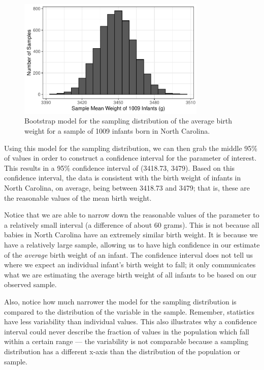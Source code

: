 \documentclass[
  letterpaper,
  DIV=11,
  numbers=noendperiod]{scrreprt}
\theoremstyle{definition}
\theoremstyle{definition}
\theoremstyle{plain}
\theoremstyle{remark}
\begin{document}
\begin{figure}

{\centering \includegraphics[width=0.8\textwidth,height=\textheight]{./images/fig-confint-samp-distn-1.pdf}

}

\caption{\label{fig-confint-samp-distn}Bootstrap model for the sampling
distribution of the average birth weight for a sample of 1009 infants
born in North Carolina.}

\end{figure}

Using this model for the sampling distribution, we can then grab the
middle 95\% of values in order to construct a confidence interval for
the parameter of interest. This results in a 95\% confidence interval of
(3418.73, 3479). Based on this confidence interval, the data is
consistent with the birth weight of infants in North Carolina, on
average, being between 3418.73 and 3479; that is, these are the
reasonable values of the mean birth weight.

Notice that we are able to narrow down the reasonable values of the
parameter to a relatively small interval (a difference of about 60
grams). This is not because all babies in North Carolina have an
extremely similar birth weight. It is because we have a relatively large
sample, allowing us to have high confidence in our estimate of the
\emph{average} birth weight of an infant. The confidence interval does
not tell us where we expect an individual infant's birth weight to fall;
it only communicates what we are estimating the average birth weight of
all infants to be based on our observed sample.

Also, notice how much narrower the model for the sampling distribution
is compared to the distribution of the variable in the sample. Remember,
statistics have less variability than individual values. This also
illustrates why a confidence interval could never describe the fraction
of values in the population which fall within a certain range --- the
variability is not comparable because a sampling distribution has a
different x-axis than the distribution of the population or sample.
\end{document}
